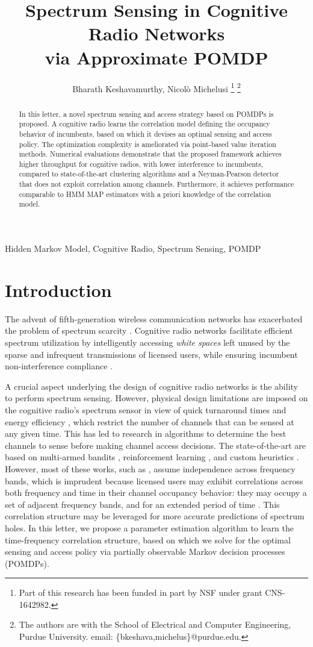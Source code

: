 \documentclass[10pt,twocolumn]{IEEEtran}
\title{Spectrum Sensing in Cognitive Radio Networks
\\
via Approximate POMDP}
\author{Bharath Keshavamurthy, Nicol\`{o} Michelusi
\thanks{Part of this research has been funded in part by NSF under grant CNS-1642982.}
\thanks{The authors are with the School of Electrical and Computer Engineering, Purdue University. email: \{bkeshava,michelus\}@purdue.edu.}
\vspace{-12mm}}
\begin{document}
\maketitle
\thispagestyle{empty}
\pagestyle{empty} 
\begin{abstract}
In this letter, a novel spectrum sensing and access strategy based on POMDPs is proposed. A cognitive radio learns the correlation model defining the occupancy behavior of incumbents, based on which it devises an optimal sensing and access policy. The optimization complexity is ameliorated via point-based value iteration methods. Numerical evaluations demonstrate that the proposed framework achieves higher throughput for cognitive radios, with lower interference to incumbents, compared to state-of-the-art clustering algorithms and a Neyman-Pearson detector that does not exploit correlation among channels. Furthermore, it achieves performance comparable to HMM MAP estimators with a priori knowledge of the correlation model.
\end{abstract}
\vspace{-4mm}
\begin{IEEEkeywords}
Hidden Markov Model, Cognitive Radio, Spectrum Sensing, POMDP
\end{IEEEkeywords}
\vspace{-4mm}
\section{Introduction}\label{I}
The advent of fifth-generation wireless communication networks has exacerbated the problem of spectrum scarcity \cite{7158089}. Cognitive radio networks facilitate efficient spectrum utilization by intelligently accessing \emph{white spaces} left unused by the sparse and infrequent transmissions of licensed users, while ensuring incumbent non-interference compliance \cite{4562537}. 

A crucial aspect underlying the design of cognitive radio networks is the ability to perform spectrum sensing. However, physical design limitations are imposed on the cognitive radio's spectrum sensor in view of quick turnaround times and energy efficiency \cite{5990482}, which restrict the number of channels that can be sensed at any given time. This has led to research in algorithms to determine the best channels to sense before making channel access decisions. The state-of-the-art are based on multi-armed bandits \cite{7094730}, reinforcement learning \cite{6507570}, and custom heuristics \cite{4554696, 6956794}. However, most of these works, such as \cite{7094730, 6507570, 7895211, 7336513, 8571293, 5167826}, assume independence across frequency bands, which is imprudent because licensed users may exhibit correlations across both frequency and time in their channel occupancy behavior: they may occupy a set of adjacent frequency bands, and for an extended period of time \cite{6188346}. This correlation structure may be leveraged for more accurate predictions of spectrum holes. In this letter, we propose a parameter estimation algorithm to learn the time-frequency correlation structure, based on which we solve for the optimal sensing and access policy via partially observable Markov decision processes (POMDPs).
\end{document}
